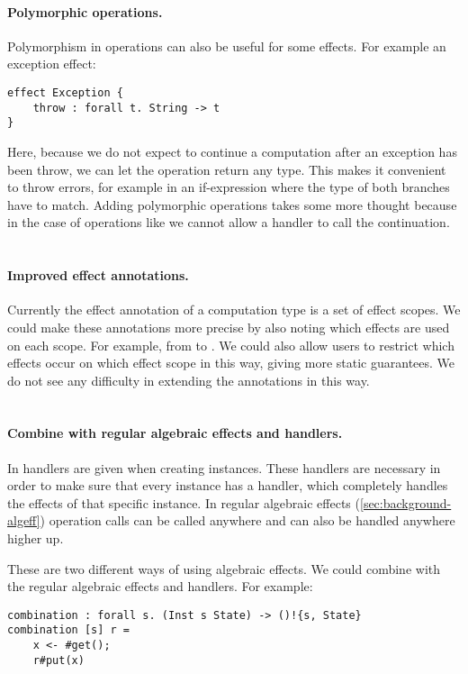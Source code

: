 \paragraph{Polymorphic operations.}
Polymorphism in operations can also be useful for some effects.
For example an exception effect:
\begin{verbatim}
effect Exception {
	throw : forall t. String -> t
}
\end{verbatim}
Here, because we do not expect to continue a computation after an exception has been throw, we can let the  operation return any type.
This makes it convenient to throw errors, for example in an if-expression where the type of both branches have to match.
Adding polymorphic operations takes some more thought because in the case of operations like  we cannot allow a handler to call the continuation.
\\\\
\paragraph{Improved effect annotations.}
Currently the effect annotation of a computation type is a set of effect scopes.
We could make these annotations more precise by also noting which effects are used on each scope.
For example, from  to .
We could also allow users to restrict which effects occur on which effect scope in this way, giving more static guarantees.
We do not see any difficulty in extending the annotations in this way.
\\\\
\paragraph{Combine with regular algebraic effects and handlers.}
In \lang{} handlers are given when creating instances.
These handlers are necessary in order to make sure that every instance has a handler, which completely handles the effects of that specific instance.
In regular algebraic effects (\cref{sec:background-algeff}) operation calls can be called anywhere and can also be handled anywhere higher up.

These are two different ways of using algebraic effects.
We could combine \lang{} with the regular algebraic effects and handlers.
For example:
\begin{verbatim}
combination : forall s. (Inst s State) -> ()!{s, State}
combination [s] r =
	x <- #get();
	r#put(x)
\end{verbatim}

